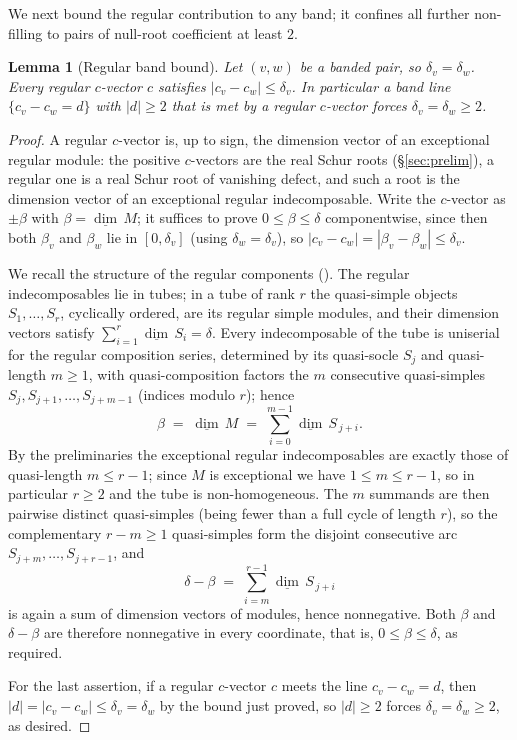 \documentclass[11pt, a4paper]{amsart}
\newtheorem{lemma}[theorem]{Lemma}
\theoremstyle{definition}
\begin{document}
We next bound the regular contribution to any band; it confines all further
non-filling to pairs of null-root coefficient at least $2$.

\begin{lemma}[Regular band bound]
\label{lem:regular_bound}
Let $(v, w)$ be a banded pair, so $\delta_v = \delta_w$. Every regular
$c$-vector $c$ satisfies $|c_v - c_w| \leq \delta_v$. In particular a band line
$\{c_v - c_w = d\}$ with $|d| \geq 2$ that is met by a regular $c$-vector
forces $\delta_v = \delta_w \geq 2$.
\end{lemma}

\begin{proof}
A regular $c$-vector is, up to sign, the dimension vector of an exceptional
regular module: the positive $c$-vectors are the real Schur roots
(\S\ref{sec:prelim}), a regular one is a real Schur root of vanishing defect,
and such a root is the dimension vector of an exceptional regular
indecomposable. Write the $c$-vector as $\pm\beta$ with $\beta = \underline{\dim}\,M$;
it suffices to prove $0 \leq \beta \leq \delta$ componentwise, since then both
$\beta_v$ and $\beta_w$ lie in $[0, \delta_v]$ (using $\delta_w = \delta_v$),
so $|c_v - c_w| = |\beta_v - \beta_w| \leq \delta_v$.

We recall the structure of the regular components
\textup{(}\cite[\S3]{Ringel1984}\textup{)}. The regular indecomposables lie
in tubes; in a tube of rank $r$ the quasi-simple objects
$S_1, \dots, S_r$, cyclically ordered, are its regular simple modules, and
their dimension vectors satisfy $\sum_{i=1}^{r} \underline{\dim}\,S_i =
\delta$. Every indecomposable of the tube is uniserial for the regular
composition series, determined by its quasi-socle $S_j$ and quasi-length
$m \geq 1$, with quasi-composition factors the $m$ consecutive quasi-simples
$S_j, S_{j+1}, \dots, S_{j+m-1}$ \textup{(}indices modulo $r$\textup{)}; hence
\[
  \beta \;=\; \underline{\dim}\,M \;=\; \sum_{i=0}^{m-1} \underline{\dim}\,S_{\,j+i}.
\]
By the preliminaries the exceptional regular indecomposables are exactly
those of quasi-length $m \leq r - 1$; since $M$ is exceptional we have
$1 \leq m \leq r - 1$, so in particular $r \geq 2$ and the tube is
non-homogeneous. The $m$ summands are then pairwise distinct quasi-simples
\textup{(}being fewer than a full cycle of length $r$\textup{)}, so the
complementary $r - m \geq 1$ quasi-simples form the disjoint consecutive arc
$S_{j+m}, \dots, S_{j+r-1}$, and
\[
  \delta - \beta \;=\; \sum_{i=m}^{r-1} \underline{\dim}\,S_{\,j+i}
\]
is again a sum of dimension vectors of modules, hence nonnegative. Both $\beta$ and $\delta -
\beta$ are therefore nonnegative in every coordinate, that is,
$0 \leq \beta \leq \delta$, as required.

For the last assertion, if a regular $c$-vector $c$ meets the line $c_v - c_w =
d$, then $|d| = |c_v - c_w| \leq \delta_v = \delta_w$ by the bound just
proved, so $|d| \geq 2$ forces $\delta_v = \delta_w \geq 2$, as desired.
\end{proof}
\end{document}
